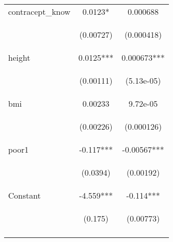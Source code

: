 \documentclass{article}[11pt,subeqn]
\begin{document}
\begin{spacing}{1.25}
\begin{table}[ht]
\begin{center}
\begin{tabular}{lcc}
  contracept\_know & 0.0123* & 0.000688 \\
  \begin{footnotesize}\end{footnotesize} & \begin{footnotesize}(0.00727)\end{footnotesize} & \begin{footnotesize}(0.000418)\end{footnotesize} \\
  height & 0.0125*** & 0.000673*** \\
  \begin{footnotesize}\end{footnotesize} & \begin{footnotesize}(0.00111)\end{footnotesize} & \begin{footnotesize}(5.13e-05)\end{footnotesize} \\
  bmi & 0.00233 & 9.72e-05 \\
  \begin{footnotesize}\end{footnotesize} & \begin{footnotesize}(0.00226)\end{footnotesize} & \begin{footnotesize}(0.000126)\end{footnotesize} \\
  poor1 & -0.117*** & -0.00567*** \\
  \begin{footnotesize}\end{footnotesize} & \begin{footnotesize}(0.0394)\end{footnotesize} & \begin{footnotesize}(0.00192)\end{footnotesize} \\
  Constant & -4.559*** & -0.114*** \\
  \begin{footnotesize}\end{footnotesize} & \begin{footnotesize}(0.175)\end{footnotesize} & \begin{footnotesize}(0.00773)\end{footnotesize} \\
  \begin{footnotesize}\end{footnotesize} & \begin{footnotesize}\end{footnotesize} & \begin{footnotesize}\end{footnotesize} \\

\end{tabular}
\end{center}
\end{table}
\end{spacing}
\end{document}
